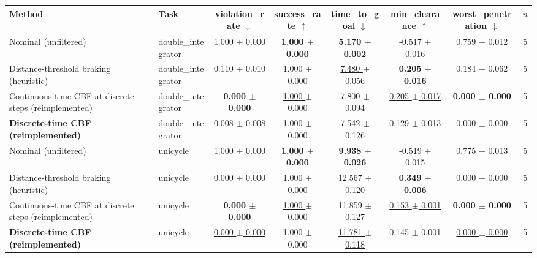 \begin{tabular}{llcccccc}
\toprule
Method & Task & violation\_rate $\downarrow$ & success\_rate $\uparrow$ & time\_to\_goal $\downarrow$ & min\_clearance $\uparrow$ & worst\_penetration $\downarrow$ & $n$ \\
\midrule
Nominal (unfiltered) & double\_integrator & 1.000 $\pm$ 0.000 & \textbf{1.000 $\pm$ 0.000} & \textbf{5.170 $\pm$ 0.002} & -0.517 $\pm$ 0.016 & 0.759 $\pm$ 0.012 & 5 \\
Distance-threshold braking (heuristic) & double\_integrator & 0.110 $\pm$ 0.010 & 1.000 $\pm$ 0.000 & \underline{7.480 $\pm$ 0.056} & \textbf{0.205 $\pm$ 0.016} & 0.184 $\pm$ 0.062 & 5 \\
Continuous-time CBF at discrete steps (reimplemented) & double\_integrator & \textbf{0.000 $\pm$ 0.000} & \underline{1.000 $\pm$ 0.000} & 7.800 $\pm$ 0.094 & \underline{0.205 $\pm$ 0.017} & \textbf{0.000 $\pm$ 0.000} & 5 \\
\textbf{Discrete-time CBF (reimplemented)} & double\_integrator & \underline{0.008 $\pm$ 0.008} & 1.000 $\pm$ 0.000 & 7.542 $\pm$ 0.126 & 0.129 $\pm$ 0.013 & \underline{0.000 $\pm$ 0.000} & 5 \\
\midrule
Nominal (unfiltered) & unicycle & 1.000 $\pm$ 0.000 & \textbf{1.000 $\pm$ 0.000} & \textbf{9.938 $\pm$ 0.026} & -0.519 $\pm$ 0.015 & 0.775 $\pm$ 0.013 & 5 \\
Distance-threshold braking (heuristic) & unicycle & 0.000 $\pm$ 0.000 & 1.000 $\pm$ 0.000 & 12.567 $\pm$ 0.120 & \textbf{0.349 $\pm$ 0.006} & 0.000 $\pm$ 0.000 & 5 \\
Continuous-time CBF at discrete steps (reimplemented) & unicycle & \textbf{0.000 $\pm$ 0.000} & \underline{1.000 $\pm$ 0.000} & 11.859 $\pm$ 0.127 & \underline{0.153 $\pm$ 0.001} & \textbf{0.000 $\pm$ 0.000} & 5 \\
\textbf{Discrete-time CBF (reimplemented)} & unicycle & \underline{0.000 $\pm$ 0.000} & 1.000 $\pm$ 0.000 & \underline{11.781 $\pm$ 0.118} & 0.145 $\pm$ 0.001 & \underline{0.000 $\pm$ 0.000} & 5 \\
\bottomrule
\end{tabular}
